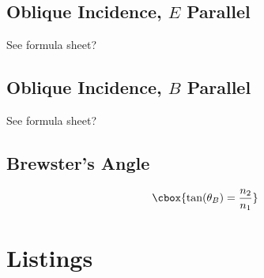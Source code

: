 \documentclass{hw}
\numberwithin{equation}{section}
\begin{document}
\subsection{Oblique Incidence, $E$ Parallel}
See formula sheet?

\subsection{Oblique Incidence, $B$ Parallel}
See formula sheet?

\subsection{Brewster's Angle}
\begin{equation}
  \cbox{\tan(\theta_B) = \frac{n_2}{n_1}}
\end{equation}

\section{Listings}
\end{document}
